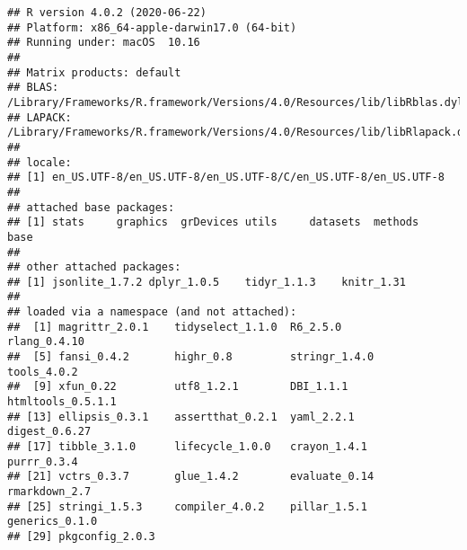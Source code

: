 \documentclass[]{article}
\begin{document}
\begin{verbatim}
## R version 4.0.2 (2020-06-22)
## Platform: x86_64-apple-darwin17.0 (64-bit)
## Running under: macOS  10.16
## 
## Matrix products: default
## BLAS:   /Library/Frameworks/R.framework/Versions/4.0/Resources/lib/libRblas.dylib
## LAPACK: /Library/Frameworks/R.framework/Versions/4.0/Resources/lib/libRlapack.dylib
## 
## locale:
## [1] en_US.UTF-8/en_US.UTF-8/en_US.UTF-8/C/en_US.UTF-8/en_US.UTF-8
## 
## attached base packages:
## [1] stats     graphics  grDevices utils     datasets  methods   base     
## 
## other attached packages:
## [1] jsonlite_1.7.2 dplyr_1.0.5    tidyr_1.1.3    knitr_1.31    
## 
## loaded via a namespace (and not attached):
##  [1] magrittr_2.0.1    tidyselect_1.1.0  R6_2.5.0          rlang_0.4.10     
##  [5] fansi_0.4.2       highr_0.8         stringr_1.4.0     tools_4.0.2      
##  [9] xfun_0.22         utf8_1.2.1        DBI_1.1.1         htmltools_0.5.1.1
## [13] ellipsis_0.3.1    assertthat_0.2.1  yaml_2.2.1        digest_0.6.27    
## [17] tibble_3.1.0      lifecycle_1.0.0   crayon_1.4.1      purrr_0.3.4      
## [21] vctrs_0.3.7       glue_1.4.2        evaluate_0.14     rmarkdown_2.7    
## [25] stringi_1.5.3     compiler_4.0.2    pillar_1.5.1      generics_0.1.0   
## [29] pkgconfig_2.0.3
\end{verbatim}
\end{document}
